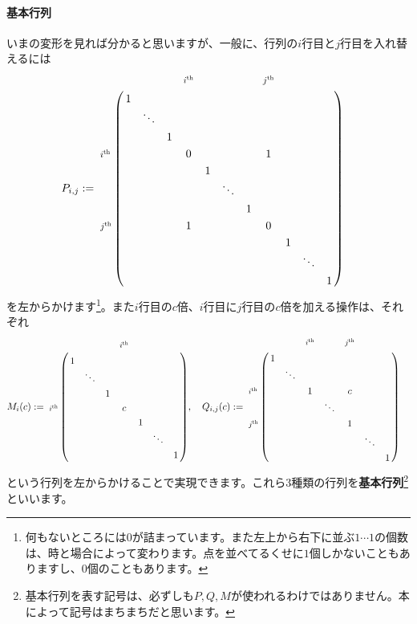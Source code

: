 \paragraph{基本行列} いまの変形を見れば分かると思いますが、一般に、行列の$i$行目と$j$行目を入れ替えるには
\begin{align*}
P_{i,j} &:= 
\bordermatrix{
& & & & \scalebox{0.8}{$i^{\text{th}}$} & & & & \scalebox{0.8}{$j^{\text{th}}$} \\
& 1 & \\
& & \ddots  &  \\
& & & 1 \\
\scalebox{0.8}{$i^{\text{th}}$} & & & & 0 & & & & 1 \\
& & & & & 1 &  \\
& & & & & & \ddots &  \\
& & & & & & & 1  \\
\scalebox{0.8}{$j^{\text{th}}$} & & & & 1 & & & & 0 \\
& & & & & & & & & 1 \\
& & & & & & & & & & \ddots \\
& & & & & & & & & & & 1 
}
\end{align*}
を左からかけます\footnote{何もないところには$0$が詰まっています。また左上から右下に並ぶ$1 \cdots 1$の個数は、時と場合によって変わります。点を並べてるくせに$1$個しかないこともありますし、$0$個のこともあります。}。また$i$行目の$c$倍、$i$行目に$j$行目の$c$倍を加える操作は、それぞれ
\begin{align*}
M_i(c) &:=
\bordermatrix{
& & & & \scalebox{0.8}{$i^{\text{th}}$} \\
& 1 & \\
& & \ddots \\
& & & 1 \\
\scalebox{0.8}{$i^{\text{th}}$} & & & & c \\
& & & & & 1 \\
& & & & & & \ddots \\
& & & & & & & 1
}, \quad
Q_{i,j}(c) :=
\bordermatrix{
&  &  & \scalebox{0.8}{$i^{\text{th}}$} & & \scalebox{0.8}{$j^{\text{th}}$} \\
& 1 & \\
& & \ddots \\
\scalebox{0.8}{$i^{\text{th}}$} & & & 1 &  & c \\
& & & & \ddots &  \\
\scalebox{0.8}{$j^{\text{th}}$} & & & & & 1 \\
& & & & & & \ddots \\
& & & & & & & 1
}
\end{align*}
という行列を左からかけることで実現できます。これら$3$種類の行列を\textbf{基本行列}\footnote{基本行列を表す記号は、必ずしも$P, Q, M$が使われるわけではありません。本によって記号はまちまちだと思います。}といいます。

